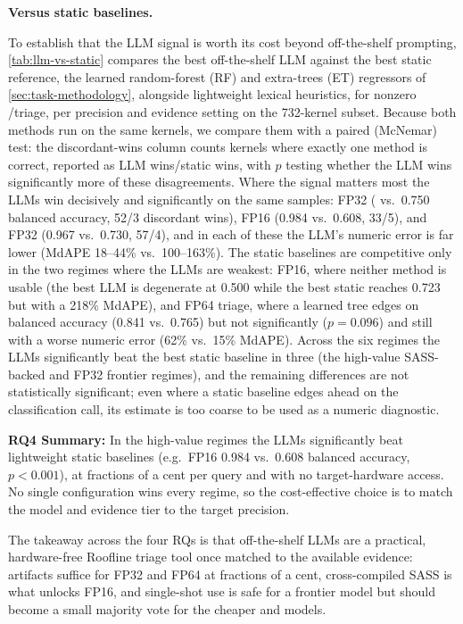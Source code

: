 \noindent\textbf{Versus static baselines.}

To establish that the LLM signal is worth its cost beyond off-the-shelf prompting, \autoref{tab:llm-vs-static} compares the best off-the-shelf LLM against the best static reference, the learned random-forest (RF) and extra-trees (ET) regressors of \autoref{sec:task-methodology}, alongside lightweight lexical heuristics, for nonzero \bandwidthbound/\computebound triage, per precision and evidence setting on the 732-kernel subset.
Because both methods run on the same kernels, we compare them with a paired (McNemar) test: the discordant-wins column counts kernels where exactly one method is correct, reported as LLM wins/static wins, with $p$ testing whether the LLM wins significantly more of these disagreements.
Where the signal matters most the LLMs win decisively and significantly on the same samples: \sourceonly FP32 ( vs.\ 0.750 balanced accuracy, 52/3 discordant wins), \sourcesass FP16 (0.984 vs.\ 0.608, 33/5), and \sourcesass FP32 (0.967 vs.\ 0.730, 57/4), and in each of these the LLM's numeric \rai error is far lower (MdAPE 18--44\% vs.\ 100--163\%).
The static baselines are competitive only in the two regimes where the LLMs are weakest: \sourceonly FP16, where neither method is usable (the best LLM is degenerate at 0.500 while the best static reaches 0.723 but with a 218\% MdAPE), and \sourcesass FP64 triage, where a learned tree edges \opus on balanced accuracy (0.841 vs.\ 0.765) but not significantly ($p=0.096$) and still with a worse numeric error (62\% vs.\ 15\% MdAPE).
Across the six regimes the LLMs significantly beat the best static baseline in three (the high-value SASS-backed and FP32 frontier regimes), and the remaining differences are not statistically significant; even where a static baseline edges ahead on the classification call, its \rai estimate is too coarse to be used as a numeric diagnostic.

\begin{rqsummary}
\textbf{RQ4 Summary:} In the high-value regimes the LLMs significantly beat lightweight static baselines (e.g.\ \sourcesass FP16 0.984 vs.\ 0.608 balanced accuracy, $p<0.001$), at fractions of a cent per query and with no target-hardware access. No single configuration wins every regime, so the cost-effective choice is to match the model and evidence tier to the target precision.
\end{rqsummary}

The takeaway across the four RQs is that off-the-shelf LLMs are a practical, hardware-free Roofline triage tool once matched to the available evidence: \sourceonly artifacts suffice for FP32 and FP64 at fractions of a cent, cross-compiled SASS is what unlocks FP16, and single-shot use is safe for a frontier \opus model but should become a small majority vote for the cheaper \gptfivefour and \gptoss models.

